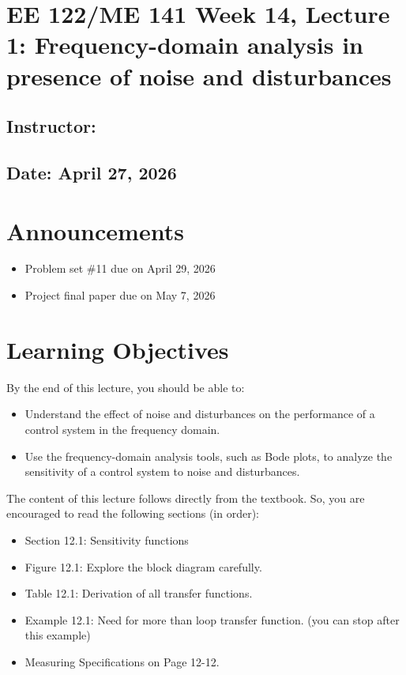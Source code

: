 \documentclass{ee122_notes}
\renewcommand{\releasedate}{April 27, 2026}
\begin{document}
\section*{EE 122/ME 141 Week 14, Lecture 1: Frequency-domain analysis in presence of noise and disturbances}
\subsection*{Instructor: \instructor}
\subsection*{Date: \releasedate}
\section{Announcements}
\begin{itemize}
    \item Problem set \#11 due on April 29, 2026 
    \item Project final paper due on May 7, 2026 
\end{itemize}
\section{Learning Objectives}
By the end of this lecture, you should be able to:
\begin{itemize}
    \item Understand the effect of noise and disturbances on the performance of a control system in the frequency domain.
    \item Use the frequency-domain analysis tools, such as Bode plots, to analyze the sensitivity of a control system to noise and disturbances.
\end{itemize}

The content of this lecture follows directly from the textbook. So, you are encouraged to read the following sections (in order):
\begin{itemize}
    \item Section 12.1: Sensitivity functions 
    \item Figure 12.1: Explore the block diagram carefully.
    \item Table 12.1: Derivation of all transfer functions.
    \item Example 12.1: Need for more than loop transfer function. (you can stop after this example)
    \item Measuring Specifications on Page 12-12. 
\end{itemize}
\end{document}
